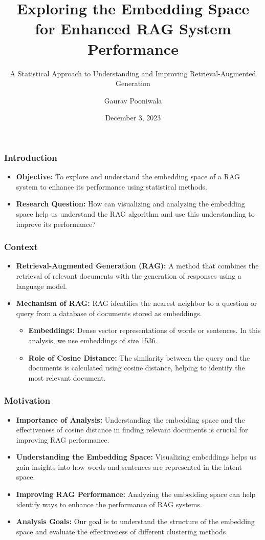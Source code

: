 \documentclass{beamer}
\title{Exploring the Embedding Space for Enhanced RAG System Performance}
\subtitle{A Statistical Approach to Understanding and Improving Retrieval-Augmented Generation}
\author{Gaurav Pooniwala}
\date{December 3, 2023}
\begin{document}
\frame{\titlepage}

\begin{frame}
\frametitle{Introduction}
\begin{itemize}
    \item \textbf{Objective:} To explore and understand the embedding space of a RAG system to enhance its performance using statistical methods.
    \item \textbf{Research Question:} How can visualizing and analyzing the embedding space help us understand the RAG algorithm and use this understanding to improve its performance?
\end{itemize}
\end{frame}

\begin{frame}
\frametitle{Context}
\begin{itemize}
    \item \textbf{Retrieval-Augmented Generation (RAG):} A method that combines the retrieval of relevant documents with the generation of responses using a language model.
    \item \textbf{Mechanism of RAG:} RAG identifies the nearest neighbor to a question or query from a database of documents stored as embeddings.
    \begin{itemize}
        \item \textbf{Embeddings:} Dense vector representations of words or sentences. In this analysis, we use embeddings of size 1536.
        \item \textbf{Role of Cosine Distance:} The similarity between the query and the documents is calculated using cosine distance, helping to identify the most relevant document.
    \end{itemize}
\end{itemize}
\end{frame}

\begin{frame}
\frametitle{Motivation}
\begin{itemize}
    \item \textbf{Importance of Analysis:} Understanding the embedding space and the effectiveness of cosine distance in finding relevant documents is crucial for improving RAG performance.
    \item \textbf{Understanding the Embedding Space:} Visualizing embeddings helps us gain insights into how words and sentences are represented in the latent space.
    \item \textbf{Improving RAG Performance:} Analyzing the embedding space can help identify ways to enhance the performance of RAG systems.
    \item \textbf{Analysis Goals:} Our goal is to understand the structure of the embedding space and evaluate the effectiveness of different clustering methods.
\end{itemize}
\end{frame}
\end{document}
